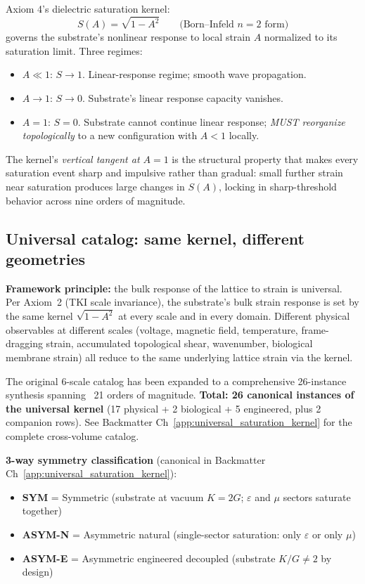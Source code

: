 Axiom 4's dielectric saturation kernel:
\begin{equation}
S(A) = \sqrt{1 - A^2} \qquad \text{(Born--Infeld } n=2 \text{ form)}
\label{eq:tki_kernel}
\end{equation}
governs the substrate's nonlinear response to local strain $A$ normalized to
its saturation limit. Three regimes:

\begin{itemize}
    \item $A \ll 1$: $S \to 1$. Linear-response regime; smooth wave propagation.
    \item $A \to 1$: $S \to 0$. Substrate's linear response capacity vanishes.
    \item $A = 1$: $S = 0$. Substrate cannot continue linear response; \emph{MUST reorganize topologically} to a new configuration with $A < 1$ locally.
\end{itemize}

The kernel's \emph{vertical tangent at $A = 1$} is the structural property that
makes every saturation event sharp and impulsive rather than gradual: small
further strain near saturation produces large changes in $S(A)$, locking in
sharp-threshold behavior across nine orders of magnitude.

\subsection{Universal catalog: same kernel, different geometries}

\textbf{Framework principle:} the bulk response of the lattice to strain is
universal. Per Axiom~2 (TKI
scale invariance), the substrate's bulk strain response is set by the
same kernel $\sqrt{1-A^2}$ at every scale and in every domain. Different
physical observables at different scales (voltage, magnetic field,
temperature, frame-dragging strain, accumulated topological shear,
wavenumber, biological membrane strain) all reduce to the same underlying
lattice strain via the kernel.

The original 6-scale catalog has been expanded to a comprehensive
26-instance synthesis spanning ~21 orders of magnitude.
\textbf{Total: 26 canonical instances of the universal kernel}
(17 physical + 2 biological + 5 engineered, plus 2 companion rows). See
Backmatter Ch~\ref{app:universal_saturation_kernel} for the complete
cross-volume catalog.

\textbf{3-way symmetry classification} (canonical in Backmatter Ch~\ref{app:universal_saturation_kernel}):
\begin{itemize}
    \item \textbf{SYM} = Symmetric (substrate at vacuum $K = 2G$; $\varepsilon$ and $\mu$ sectors saturate together)
    \item \textbf{ASYM-N} = Asymmetric natural (single-sector saturation: only $\varepsilon$ or only $\mu$)
    \item \textbf{ASYM-E} = Asymmetric engineered decoupled (substrate $K/G \neq 2$ by design)
\end{itemize}

